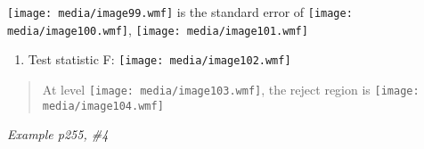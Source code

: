 \texttt{[image: media/image99.wmf]} is the standard error of
\texttt{[image: media/image100.wmf]},
\texttt{[image: media/image101.wmf]}

\begin{enumerate}
\def\labelenumi{\arabic{enumi}.}
\setcounter{enumi}{1}
\item
  Test statistic F: \texttt{[image: media/image102.wmf]}
\end{enumerate}

\begin{quote}
At level \texttt{[image: media/image103.wmf]}, the reject region is
\texttt{[image: media/image104.wmf]}
\end{quote}

\emph{Example p255, \#4}
